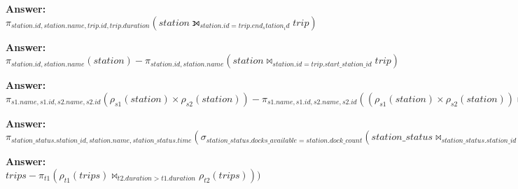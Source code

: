 \begin{questions}
\textbf{Answer:}  \\
    $\pi_{station.id, station.name, trip.id, trip.duration} (station \leftouterjoin_{station.id=trip.end_station_id} trip)$ \\
\vspace{50 mm}

\question 
\textbf{Answer:} \\
    $\pi_{station.id, station.name} (station) - \pi_{station.id, station.name} (station \bowtie_{station.id=trip.start\_station\_id} trip)$ \\
\vspace{50 mm}

\question 

\textbf{Answer:} \\
    $\pi_{s1.name, s1.id, s2.name, s2.id} (\rho_{s1} (station) \times \rho_{s2} (station)) - \pi_{s1.name, s1.id, s2.name, s2.id} ((\rho_{s1} (station) \times \rho_{s2} (station)) \bowtie_{s1.id=start\_station\_id \; and \; s2.id=end\_station\_id} trip)$\\
\vspace{50 mm}

\question 

\textbf{Answer:} \\
    $\pi_{station\_status.station\_id, station.name, station\_status.time} (\sigma_{station\_status.docks\_available=station.dock\_count} (station\_status \bowtie_{station\_status.station\_id=station.id} station))$\\
\vspace{50 mm}

\question 
\textbf{Answer:} \\
    $trips - \pi_{t1} (\rho_{t1} (trips) \bowtie_{t2.duration > t1.duration} \rho_{t2} (trips)))$\\
\vspace{50 mm}


\end{questions}
\bigskip 
\noindent



